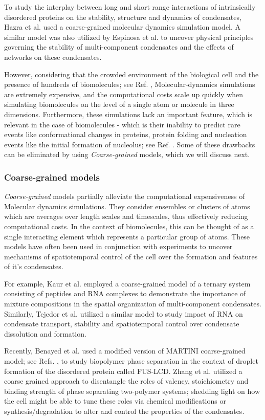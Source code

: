 To study the interplay between long and short range interactions of intrinsically disordered proteins on the stability, structure and dynamics of condensates, Hazra et al. \cite{Hazra2021} used a coarse-grained molecular dynamics simulation model.
A similar model was also utilized by Espinosa et al. \cite{Espinosa2020} to uncover physical principles governing the stability of multi-component condensates and the effects of networks on these condensates.

However, considering that the crowded environment of the biological cell and the presence of hundreds of biomolecules; see Ref. \cite{Ellis2003}, Molecular-dynamics simulations are extremely expensive, and the computational costs scale up quickly when simulating biomolecules on the level of a single atom or molecule in three dimensions.
Furthermore, these simulations lack an important feature, which is relevant in the case of biomolecules - which is their inability to predict rare events like conformational changes in proteins, protein folding and nucleation events like the initial formation of nucleolus; see Ref. \cite{Falahati2016}.
Some of these drawbacks can be eliminated by using \textit{Coarse-grained} models, which we will discuss next. 
\subsubsection{Coarse-grained models}

\textit{Coarse-grained} models partially alleviate the computational expensiveness of Molecular dynamics simulations.
They consider ensembles or clusters of atoms which are averages over length scales and timescales, thus effectively reducing computational costs.
In the context of biomolecules, this can be thought of as a single interacting element which represents a particular group of atoms.
These models have often been used in conjunction with experiments to uncover mechanisms of spatiotemporal control of the cell over the formation and features of it's condensates.

For example, Kaur et al. \cite{Kaur2021} employed a coarse-grained model of a ternary system consisting of peptides and RNA complexes to demonstrate the importance of mixture compositions in the spatial organization of multi-component condensates. 
Similarly, Tejedor et al. \cite{Tejedor2021} utilized a similar model to study impact of RNA on condensate transport, stability and spatiotemporal control over condensate dissolution and formation.

Recently, Benayed et al. \cite{Benayad2021} used a modified version of MARTINI coarse-grained model; see Refs. \cite{deJong2013, Marrink2007}, to study biopolymer phase separation in the context of droplet formation of the disordered protein called FUS-LCD.
Zhang et al. \cite{Zhang2021} utilized a coarse grained approach to disentangle the roles of valency, stoichiometry and binding strength of phase separating two-polymer systems; shedding light on how the cell might be able to tune these roles via chemical modifications or synthesis/degradation to alter and control the properties of the condensates. 

